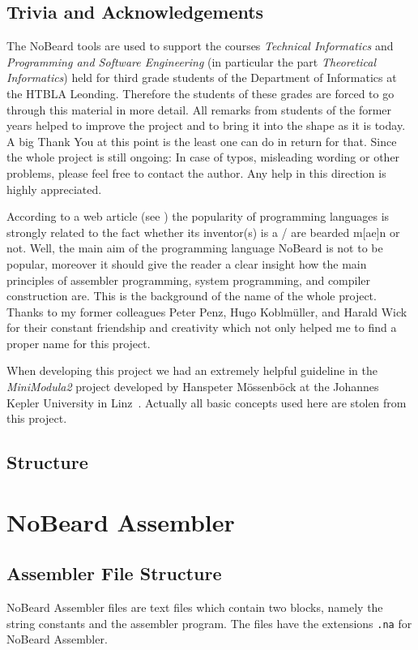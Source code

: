 \documentclass[11pt]{report}
\newcommand{\leongage}{NoBeard}
\begin{document}
\section{Trivia and Acknowledgements}
The \leongage{} tools are used to support the courses {\em Technical Informatics} and {\em Programming and Software Engineering} (in particular the part {\em Theoretical Informatics}) held for third grade students of the Department of Informatics at the HTBLA Leonding. Therefore the students of these grades are forced to go through this material in more detail. All remarks from students of the former years helped to improve the project and to bring it into the shape as it is today. A big Thank You at this point is the least one can do in return for that. Since the whole project is still ongoing: In case of typos, misleading wording or other problems, please feel free to contact the author. Any help in this direction is highly appreciated.

According to a web article (see \cite{khason_computer_2008}) the popularity of programming languages is strongly related to the fact whether its inventor(s) is a / are  bearded m[ae]n or not. Well, the main aim of the programming language \leongage{} is not to be popular,
moreover it should give the reader a clear insight how the main principles of assembler programming, system programming, and compiler construction are. This is the background of the name of the whole project. Thanks to my former colleagues Peter Penz, Hugo Koblmüller, and Harald Wick for their constant friendship and creativity which not only helped me to find a proper name for this project.

When developing this project we had an extremely helpful guideline in the {\em MiniModula2} project developed by Hanspeter Mössenböck at the Johannes Kepler University in Linz~\cite{mossenbock_formale_1991}. Actually all basic concepts used here are stolen from this project.

\section{Structure}




\chapter{\leongage{} Assembler}
\section{Assembler File Structure}
\leongage{} Assembler files are text files which contain two blocks, namely the string constants and the assembler program. The files have the extensions \lstinline$.na$ for \leongage{} Assembler.
\end{document}
